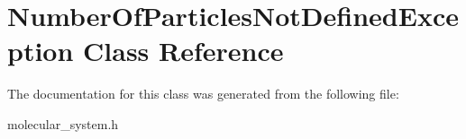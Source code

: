 \hypertarget{classNumberOfParticlesNotDefinedException}{}\section{Number\+Of\+Particles\+Not\+Defined\+Exception Class Reference}
\label{classNumberOfParticlesNotDefinedException}


The documentation for this class was generated from the following file\+:\begin{DoxyCompactItemize}
\item 
molecular\+\_\+system.\+h\end{DoxyCompactItemize}
